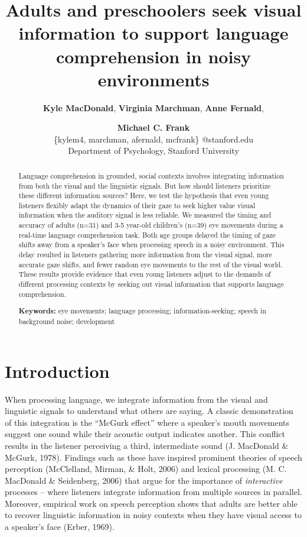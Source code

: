 \documentclass[10pt, letterpaper]{article}
\title{Adults and preschoolers seek visual information to support language
comprehension in noisy environments}
\author{{\large \bf Kyle MacDonald}, {\large \bf Virginia Marchman}, {\large \bf Anne Fernald}, \and {\large \bf Michael C. Frank} \\ \{kylem4, marchman, afernald, mcfrank\} @stanford.edu \\ Department of Psychology, Stanford University}
\begin{document}
\maketitle

\begin{abstract}
Language comprehension in grounded, social contexts involves integrating
information from both the visual and the linguistic signals. But how
should listeners prioritize these different information sources? Here,
we test the hypothesis that even young listeners flexibly adapt the
dynamics of their gaze to seek higher value visual information when the
auditory signal is less reliable. We measured the timing and accuracy of
adults (n=31) and 3-5 year-old children's (n=39) eye movements during a
real-time language comprehension task. Both age groups delayed the
timing of gaze shifts away from a speaker's face when processing speech
in a noisy environment. This delay resulted in listeners gathering more
information from the visual signal, more accurate gaze shifts, and fewer
random eye movements to the rest of the visual world. These results
provide evidence that even young listeners adjust to the demands of
different processing contexts by seeking out visual information that
supports language comprehension.

\textbf{Keywords:}
eye movements; language processing; information-seeking; speech in
background noise; development
\end{abstract}

\section{Introduction}\label{introduction}

When processing language, we integrate information from the visual and
linguistic signals to understand what others are saying. A classic
demonstration of this integration is the ``McGurk effect'' where a
speaker's mouth movements suggest one sound while their acoustic output
indicates another. This conflict results in the listener perceiving a
third, intermediate sound (J. MacDonald \& McGurk, 1978). Findings such
as these have inspired prominent theories of speech perception
(McClelland, Mirman, \& Holt, 2006) and lexical processing (M. C.
MacDonald \& Seidenberg, 2006) that argue for the importance of
\emph{interactive} processes -- where listeners integrate information
from multiple sources in parallel. Moreover, empirical work on speech
perception shows that adults are better able to recover linguistic
information in noisy contexts when they have visual access to a
speaker's face (Erber, 1969).
\end{document}
